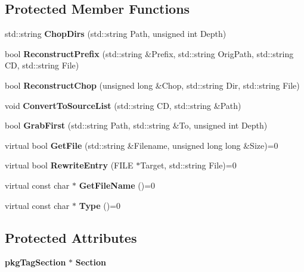 \subsection*{\-Protected \-Member \-Functions}
\begin{DoxyCompactItemize}
\item 
std\-::string {\bfseries \-Chop\-Dirs} (std\-::string \-Path, unsigned int \-Depth)\label{classIndexCopy_a0d82115a8735eb04d3f2414b0cc780fe}

\item 
bool {\bfseries \-Reconstruct\-Prefix} (std\-::string \&\-Prefix, std\-::string \-Orig\-Path, std\-::string \-C\-D, std\-::string \-File)\label{classIndexCopy_a6d3279db5b8b2e40e0f65efeb54fd851}

\item 
bool {\bfseries \-Reconstruct\-Chop} (unsigned long \&\-Chop, std\-::string \-Dir, std\-::string \-File)\label{classIndexCopy_a7516af047fcd6a08fd90aa8efe90c256}

\item 
void {\bfseries \-Convert\-To\-Source\-List} (std\-::string \-C\-D, std\-::string \&\-Path)\label{classIndexCopy_a24d1b286394b3d1bd17d91ba42bfc00c}

\item 
bool {\bfseries \-Grab\-First} (std\-::string \-Path, std\-::string \&\-To, unsigned int \-Depth)\label{classIndexCopy_a9bd5e5b854dd92b336878c85404250f0}

\item 
virtual bool {\bfseries \-Get\-File} (std\-::string \&\-Filename, unsigned long long \&\-Size)=0\label{classIndexCopy_a17755664c4f202b10c57538a981ac89c}

\item 
virtual bool {\bfseries \-Rewrite\-Entry} (\-F\-I\-L\-E $\ast$\-Target, std\-::string \-File)=0\label{classIndexCopy_af09c85eee8dfbcce95d74e47cb7be9a0}

\item 
virtual const char $\ast$ {\bfseries \-Get\-File\-Name} ()=0\label{classIndexCopy_a9ef2e4bbd90ef19a9d05b58f55bee6a1}

\item 
virtual const char $\ast$ {\bfseries \-Type} ()=0\label{classIndexCopy_aceef41e7da2dc0bb9859ca0044463c88}

\end{DoxyCompactItemize}
\subsection*{\-Protected \-Attributes}
\begin{DoxyCompactItemize}
\item 
{\bf pkg\-Tag\-Section} $\ast$ {\bfseries \-Section}\label{classIndexCopy_a076d8619a9760c7e1bcb3bc49711fedf}

\end{DoxyCompactItemize}



